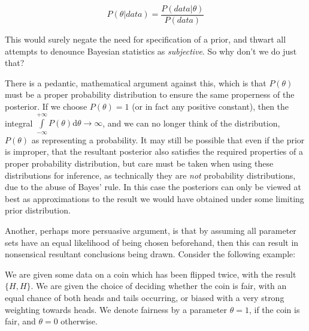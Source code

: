 \documentclass[11pt,fullpage]{book}
\begin{document}
\begin{equation}
P(\theta|data) = \frac{P(data|\theta)} {P(data)}
\end{equation}\label{eq:Prior_BayesNormalisedLikelihood}


This would surely negate the need for specification of a prior, and thwart all attempts to denounce Bayesian statistics as \textit{subjective}. So why don't we do just that? 

There is a pedantic, mathematical argument against this, which is that $P(\theta)$ must be a proper probability distribution to ensure the same properness of the posterior. If we choose $P(\theta) = 1$ (or in fact any positive constant), then the integral $\int\limits_{-\infty}^{+\infty}P(\theta)\mathrm{d}\theta\rightarrow\infty$, and we can no longer think of the distribution, $P(\theta)$ as representing a probability. It may still be possible that even if the prior is improper, that the resultant posterior also satisfies the required properties of a proper probability distribution, but care must be taken when using these distributions for inference, as technically they are \textit{not} probability distributions, due to the abuse of Bayes' rule. In this case the posteriors can only be viewed at best as approximations to the result we would have obtained under some limiting prior distribution.

Another, perhaps more persuasive argument, is that by assuming all parameter sets have an equal likelihood of being chosen beforehand, then this can result in nonsensical resultant conclusions being drawn. Consider the following example: 

We are given some data on a coin which has been flipped twice, with the result $\{H,H\}$. We are given the choice of deciding whether the  coin is fair, with an equal chance of both heads and tails occurring, or biased with a very strong weighting towards heads. We denote fairness by a parameter $\theta=1$, if the coin is fair, and $\theta=0$ otherwise.
\end{document}

